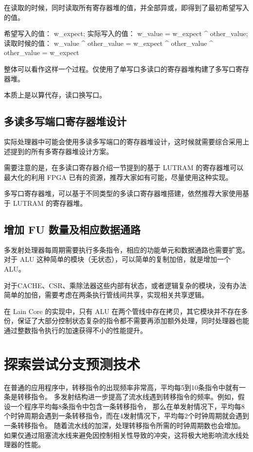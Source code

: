 \begin{itemize}
  在读取的时候，同时读取所有寄存器堆的值，并全部异或，即得到了最初希望写入的值。

\begin{CodeBlock}[language=BookText]
希望写入的值： w_expect;
实际写入的值： w_value = w_expect ^ other_value;
读取时候的值： w_value ^ other_value = w_expect ^ other_value ^ other_value = w_expect
\end{CodeBlock}

  整体可以看作这样一个过程。仅使用了单写口多读口的寄存器堆构建了多写口寄存器堆。

  本质上是以算代存，读口换写口。
\end{itemize}

\subsection{多读多写端口寄存器堆设计}\label{sec:11-advanced-cpu-015}

实际处理器中可能会使用多读多写端口的寄存器堆设计，这时候就需要综合采用上述提到的所有多寄存器堆设计方案。

需要注意的是，在多读口寄存器介绍一节提到的基于 LUTRAM 的寄存器堆可以最大化的利用 FPGA 已有的资源，推荐大家如有可能，尽量使用这种实现。

多写口寄存器堆，可以基于不同类型的多读口寄存器堆搭建，依然推荐大家使用基于 LUTRAM 的寄存器堆。

\subsection{增加 FU 数量及相应数据通路}\label{sec:11-advanced-cpu-016}

多发射处理器每周期需要执行多条指令，相应的功能单元和数据通路也需要扩宽。对于 ALU 这种简单的模块（无状态），可以简单的复制加倍，就是增加一个 ALU。

对于CACHE、CSR、乘除法器这些内部有状态，或者逻辑复杂的模块，没有办法简单的加倍，需要考虑在两条执行管线间共享，实现相关共享逻辑。

在 Lain Core 的实现中，只有 ALU 在两个管线中存在拷贝，其它模块并不存在多份，保证了大部分控制状态复杂的指令都不需要再添加额外处理，同时处理器也能通过整数指令执行的加速获得不小的性能提升。

\section{探索尝试分支预测技术}\label{sec:11-advanced-cpu-017}

在普通的应用程序中，转移指令的出现频率非常高，平均每5到10条指令中就有一条是转移指令。
多发射结构进一步提高了流水线遇到转移指令的频率。例如，假设一个程序平均每8条指令中包含一条转移指令，
那么在单发射情况下，平均每8个时钟周期会遇到一条转移指令，而在4发射情况下，平均每2个时钟周期就会遇到一条转移指令。
随着流水线的加深，处理转移指令所需的时钟周期数也会增加。
如果仅通过阻塞流水线来避免因控制相关性导致的冲突，这将极大地影响流水线处理器的性能。

